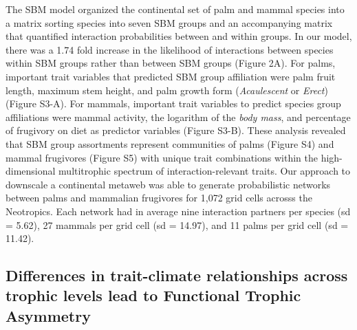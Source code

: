 \documentclass[
]{agujournal2019}
\begin{document}
The SBM model organized the continental set of palm and mammal species
into a matrix sorting species into seven SBM groups and an accompanying
matrix that quantified interaction probabilities between and within
groups. In our model, there was a 1.74 fold increase in the likelihood
of interactions between species within SBM groups rather than between
SBM groups (Figure 2A). For palms, important trait variables that
predicted SBM group affiliation were palm fruit length, maximum stem
height, and palm growth form (\emph{Acaulescent} or \emph{Erect})
(Figure S3-A). For mammals, important trait variables to predict species
group affiliations were mammal activity, the logarithm of the \emph{body
mass}, and percentage of frugivory on diet as predictor variables
(Figure S3-B). These analysis revealed that SBM group assortments
represent communities of palms (Figure S4) and mammal frugivores (Figure
S5) with unique trait combinations within the high-dimensional
multitrophic spectrum of interaction-relevant traits. Our approach to
downscale a continental metaweb was able to generate probabilistic
networks between palms and mammalian frugivores for 1,072 grid cells
acrosss the Neotropics. Each network had in average nine interaction
partners per species (sd = 5.62), 27 mammals per grid cell (sd = 14.97),
and 11 palms per grid cell (sd = 11.42).

\subsection{Differences in trait-climate relationships across trophic
levels lead to Functional Trophic
Asymmetry}\label{differences-in-trait-climate-relationships-across-trophic-levels-lead-to-functional-trophic-asymmetry}
\end{document}
